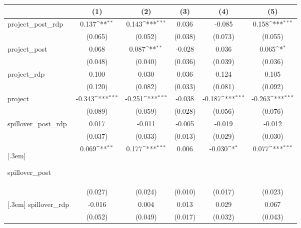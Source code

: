{\footnotesize
\def\sym#1{\ifmmode^{#1}\else\(^{#1}\)\fi}
\begin{tabular}{l*{5}{c}}
          &\multicolumn{1}{c}{(1)}         &\multicolumn{1}{c}{(2)}         &\multicolumn{1}{c}{(3)}         &\multicolumn{1}{c}{(4)}         &\multicolumn{1}{c}{(5)}         \\
\hline
project\_post\_rdp&    0.137\sym{**} &    0.143\sym{***}&    0.036         &   -0.085         &    0.158\sym{***}\\
          &  (0.065)         &  (0.052)         &  (0.038)         &  (0.073)         &  (0.055)         \\
[.3em]
project\_post&    0.068         &    0.087\sym{**} &   -0.028         &    0.036         &    0.065\sym{*}  \\
          &  (0.048)         &  (0.040)         &  (0.036)         &  (0.039)         &  (0.036)         \\
[.3em]
project\_rdp&    0.100         &    0.030         &    0.036         &    0.124         &    0.105         \\
          &  (0.120)         &  (0.082)         &  (0.033)         &  (0.081)         &  (0.092)         \\
[.3em]
project   &   -0.343\sym{***}&   -0.251\sym{***}&   -0.038         &   -0.187\sym{***}&   -0.263\sym{***}\\
          &  (0.089)         &  (0.059)         &  (0.028)         &  (0.056)         &  (0.076)         \\
[.3em]


spillover\_post\_rdp&    0.017         &   -0.011         &   -0.005         &   -0.019         &   -0.012         \\
          &  (0.037)         &  (0.033)         &  (0.013)         &  (0.029)         &  (0.030)         \\


[.3em]



spillover\_post&    0.069\sym{**} &    0.177\sym{***}&    0.006         &   -0.030\sym{*}  &    0.077\sym{***}\\
          &  (0.027)         &  (0.024)         &  (0.010)         &  (0.017)         &  (0.023)         \\



[.3em]
spillover\_rdp&   -0.016         &    0.004         &    0.013         &    0.029         &    0.067         \\
          &  (0.052)         &  (0.049)         &  (0.017)         &  (0.032)         &  (0.043)         \\



\end{tabular}}
